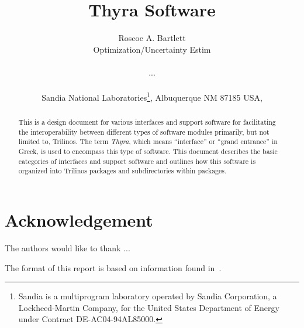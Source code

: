 \documentclass[pdf,ps2pdf,11pt]{SANDreport}
\title{
Thyra Software
}
\author{
Roscoe A. Bartlett \\ Optimization/Uncertainty Estim \\ \\
... \\ \\
Sandia National Laboratories\footnote{
Sandia is a multiprogram laboratory operated by Sandia Corporation, a
Lockheed-Martin Company, for the United States Department of Energy
under Contract DE-AC04-94AL85000.}, Albuquerque NM 87185 USA, \\
}
\date{}
\begin{document}
\raggedright

\maketitle

%

%
\begin{abstract}
%
This is a design document for various interfaces and support software for
facilitating the interoperability between different types of software modules
primarily, but not limited to, Trilinos.  The term {}\textit{Thyra}, which
means ``interface'' or ``grand entrance'' in Greek, is used to encompass this
type of software.  This document describes the basic categories of interfaces
and support software and outlines how this software is organized into Trilinos
packages and subdirectories within packages.
%
\end{abstract}
%

%
\clearpage
\section*{Acknowledgement}
The authors would like to thank ...

The format of this report is based on information found
in~\cite{Sand98-0730}.

%
\clearpage
\tableofcontents
\listoffigures

\end{document}
